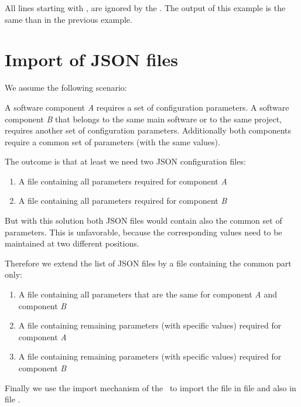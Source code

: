 All lines starting with \pcode{//}, are ignored by the \pkg. The output of this example is the same than in the previous example.



\newpage

\section{Import of JSON files}

We assume the following scenario:

A software component \textit{A} requires a set of configuration parameters. A software component \textit{B} that belongs to the same
main software or to the same project, requires another set of configuration parameters. Additionally both components
require a common set of parameters (with the same values).

The outcome is that at least we need two JSON configuration files:

\begin{enumerate}
   \item A file  containing all parameters required for component \textit{A}
   \item A file  containing all parameters required for component \textit{B}
\end{enumerate}

But with this solution both JSON files would contain also the common set of parameters. This is unfavorable, because
the corresponding values need to be maintained at two different positions.

Therefore we extend the list of JSON files by a file containing the common part only:

\begin{enumerate}
   \item A file  containing all parameters that are the same for component \textit{A} and component \textit{B}
   \item A file  containing remaining parameters (with specific values) required for component \textit{A}
   \item A file  containing remaining parameters (with specific values) required for component \textit{B}
\end{enumerate}

Finally we use the import mechanism of the \pkg\ to import the file  in file  and also in
file .


